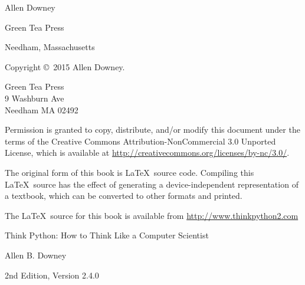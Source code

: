 \documentclass[10pt]{book}
\newcommand{\thetitle}{Think Python: How to Think Like a Computer Scientist}
\newcommand{\theversion}{2nd Edition, Version 2.4.0}
\newcommand{\thedate}{}
\begin{document}
\begin{latexonly}
\begin{flushright}
\vspace{1in}


{\Large
Allen Downey\\
}


\vspace{0.5in}

{\Large Green Tea Press}

{\small Needham, Massachusetts}

\vfill

\end{flushright}


\pagebreak
\thispagestyle{empty}

{\small
Copyright \copyright ~2015 Allen Downey.


\vspace{0.2in}

\begin{flushleft}
Green Tea Press       \\
9 Washburn Ave        \\
Needham MA 02492
\end{flushleft}

Permission is granted to copy, distribute, and/or modify this document
under the terms of the Creative Commons Attribution-NonCommercial 3.0 Unported
License, which is available at \url{http://creativecommons.org/licenses/by-nc/3.0/}.

The original form of this book is \LaTeX\ source code. Compiling this
\LaTeX\ source has the effect of generating a device-independent
representation of a textbook, which can be converted to other formats
and printed.

The \LaTeX\ source for this book is available from
\url{http://www.thinkpython2.com}

\vspace{0.2in}

} %

\end{latexonly}



\begin{htmlonly}


{\Large \thetitle}

{\large Allen B. Downey}

\theversion

\thedate

\setcounter{chapter}{-1}

\end{htmlonly}
\end{document}

